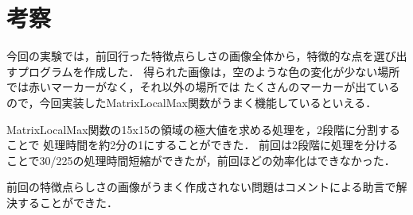 \documentclass[11pt]{jarticle}
\begin{document}
\section{考察}

今回の実験では，前回行った特徴点らしさの画像全体から，特徴的な点を選び出すプログラムを作成した．
得られた画像は，空のような色の変化が少ない場所では赤いマーカーがなく，それ以外の場所では
たくさんのマーカーが出ているので，今回実装したMatrixLocalMax関数がうまく機能しているといえる．

MatrixLocalMax関数の15x15の領域の極大値を求める処理を，2段階に分割することで
処理時間を約2分の1にすることができた．
前回は2段階に処理を分けることで30/225の処理時間短縮ができたが，前回ほどの効率化はできなかった．

前回の特徴点らしさの画像がうまく作成されない問題はコメントによる助言で解決することができた．
\end{document}
